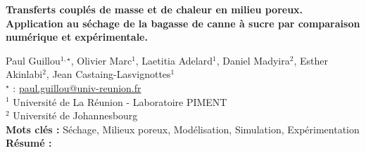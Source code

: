 


    \newpage


%
\begin{flushleft}
\addtocounter{section}{1}
{\Large \textbf{Transferts couplés de masse et de chaleur en milieu poreux. Application au séchage de la bagasse de canne à sucre par comparaison numérique et expérimentale.}}\label{ref:52}
\end{flushleft}
%
Paul Guillou$^{1,\star}$, Olivier Marc$^{1}$, Laetitia Adelard$^{1}$, Daniel Madyira$^{2}$, Esther Akinlabi$^{2}$, Jean Castaing-Lasvignottes$^{1}$\\[2mm]
$^{\star}$ \Letter : \url{paul.guillou@univ-reunion.fr}\\[2mm]
{\footnotesize $^{1}$ Université de La Réunion - Laboratoire PIMENT}\\
{\footnotesize $^{2}$ Université de Johannesbourg}\\
[4mm]
%
\noindent \textbf{Mots clés : } Séchage, Milieux poreux, Modélisation, Simulation, Expérimentation\\[4mm]
%
\noindent \textbf{Résumé : } 


